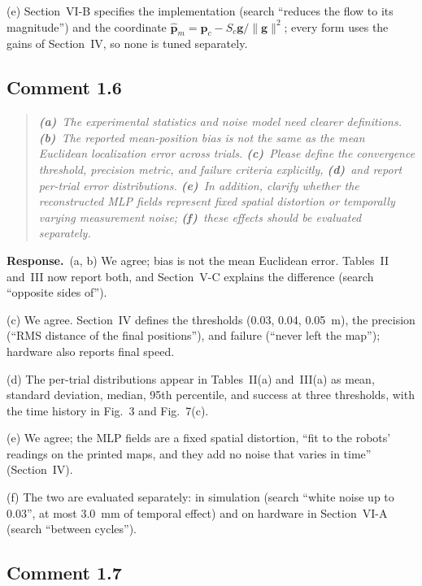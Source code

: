 \documentclass[10pt]{article}
\newcommand{\rev}[1]{#1}                             %
\newcommand{\resp}{\par\textbf{Response.}~}
\begin{document}
(e) Section~VI-B specifies the implementation (search ``reduces the flow to its magnitude'') and the coordinate $\hat{\mathbf{p}}_m = \mathbf{p}_c - S_c\mathbf{g}/\|\mathbf{g}\|^2$; every form uses the gains of Section~IV, so none is tuned separately.

\subsection*{Comment 1.6}

\begin{quote}\itshape
\textbf{(a)}~The experimental statistics and noise model need clearer definitions.
\textbf{(b)}~The reported mean-position bias is not the same as the mean Euclidean localization error across trials.
\textbf{(c)}~Please define the convergence threshold, precision metric, and failure criteria explicitly,
\textbf{(d)}~and report per-trial error distributions.
\textbf{(e)}~In addition, clarify whether the reconstructed MLP fields represent fixed spatial distortion or temporally varying measurement noise;
\textbf{(f)}~these effects should be evaluated separately.
\end{quote}

\resp (a, b) We agree; bias is not the mean Euclidean error. Tables~II and~III now report both, and Section~V-C explains the difference (search ``opposite sides of'').

(c) We agree. Section~IV defines the thresholds (0.03, 0.04, 0.05~m), the precision (``RMS distance of the final positions''), and failure (``never left the map''); hardware also reports final speed.

(d) The per-trial distributions appear in Tables~II(a) and~III(a) as mean, standard deviation, median, 95th percentile, and success at three thresholds, with the time history in Fig.~3 and \rev{Fig.~7(c)}.

(e) We agree; the MLP fields are a fixed spatial distortion, ``fit to the robots' readings on the printed maps, and they add no noise that varies in time'' (Section~IV).

(f) The two are evaluated separately: in simulation (search ``white noise up to 0.03'', at most \rev{3.0}~mm of temporal effect) and on hardware in Section~VI-A (search ``between cycles'').

\subsection*{Comment 1.7}
\end{document}
